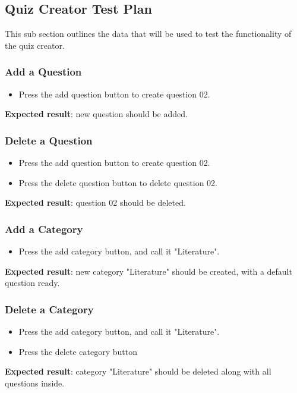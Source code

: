 \subsection{Quiz Creator Test Plan}
This sub section outlines the data that will be used to test the functionality of the quiz creator.

\subsubsection{Add a Question}
\begin{itemize}
\item Press the add question button to create question 02.
\end{itemize}
\textbf{Expected result}: new question should be added.

\subsubsection{Delete a Question}
\begin{itemize}
\item Press the add question button to create question 02.
\item Press the delete question button to delete question 02.
\end{itemize}
\textbf{Expected result}: question 02 should be deleted.

\subsubsection{Add a Category}
\begin{itemize}
\item Press the add category button, and call it "Literature".
\end{itemize}
\textbf{Expected result}: new category "Literature" should be created, with a default question ready.

\subsubsection{Delete a Category}
\begin{itemize}
\item Press the add category button, and call it "Literature".
\item Press the delete category button
\end{itemize}
\textbf{Expected result}: category "Literature" should be deleted along with all questions inside.
